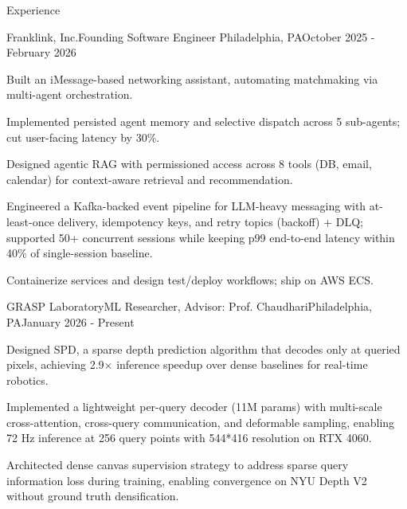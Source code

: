 \documentclass[
	10pt, %
]{resume} %
\begin{document}
\begin{rSection}{Experience}

	\begin{rExperience}{Franklink, Inc.}{Founding Software Engineer\,\,{\small{}}}{Philadelphia, PA}{October 2025 - February 2026}

		\item Built an iMessage-based networking assistant, automating matchmaking via multi-agent orchestration.
		\item Implemented persisted agent memory and selective dispatch across 5 sub-agents; cut user-facing latency by 30\%.
		\item Designed agentic RAG with permissioned access across 8 tools (DB, email, calendar) for context-aware retrieval and recommendation.
		\item Engineered a Kafka-backed event pipeline for LLM-heavy messaging with at-least-once delivery, idempotency keys, and retry topics (backoff) + DLQ; supported 50+ concurrent sessions while keeping p99 end-to-end latency within 40\% of single-session baseline.
		\item Containerize services and design test/deploy workflows; ship on AWS ECS.

	\end{rExperience}


	\begin{rExperience}{GRASP Laboratory}{ML Researcher, Advisor: Prof. Chaudhari}{Philadelphia, PA}{January 2026 - Present}

		\item Designed SPD, a sparse depth prediction algorithm that decodes only at queried pixels, achieving 2.9$\times$ inference speedup over dense baselines for real-time robotics.
		\item Implemented a lightweight per-query decoder (11M params) with multi-scale cross-attention, cross-query communication, and deformable sampling, enabling 72 Hz inference at 256 query points with 544*416 resolution on RTX 4060.
		\item Architected dense canvas supervision strategy to address sparse query information loss during training, enabling convergence on NYU Depth V2 without ground truth densification.

	\end{rExperience}


\end{rSection}
\end{document}
